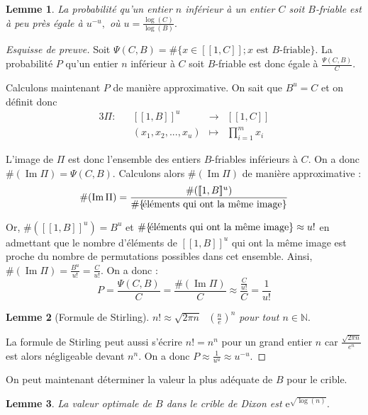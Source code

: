 \documentclass[french, 12pt, titlepage]{article}
\DeclareMathOperator{\Ima}{Im}
\newcommand{\N}{\mathbb{N}}
\newtheorem{lemme}{Lemme}
\begin{document}
\begin{lemme}
La probabilité qu'un entier $n$ inférieur à un entier $C$ soit
$B$-friable est à peu près égale à $u^{-u},$ où $u = \frac{\log(C)}{\log(B)}.$
\end{lemme}

\begin{proof}[Esquisse de preuve]

Soit $\Psi(C, B) = \#\{x \in [\![1, C]\!]; x \text{ est } B\text{-friable}\}.$
La probabilité $P$ qu'un entier $n$ inférieur à $C$ soit $B$-friable est donc égale à $\frac{\Psi(C, B)}{C}.$

Calculons maintenant $P$ de manière approximative. On sait que $B^u =
C$ et on définit donc 
\begin{alignat*}{3}
\Pi : && [\![1, B]\!]^u & \to & [\![1, C]\!] \\
&& (x_1, x_2, ..., x_u) & \mapsto & \prod\limits_{i = 1}^m x_i
\end{alignat*}

L'image de $\Pi$ est donc l'ensemble des entiers $B$-friables inférieurs à $C.$ On a donc $\#(\Ima \Pi) = \Psi(C, B).$ Calculons alors $\#(\Ima \Pi)$ de manière approximative :
\[\#(\Ima \Pi) = \frac{\#([\![1, B]\!]^u)}{\#\{\text{\!éléments qui ont la même image}\}}\]

Or, $\#([\![1, B]\!]^u) = B^u$ et
$\#\{\text{\!éléments qui ont la même image}\} \approx u!$ en admettant que le nombre d'éléments de $[\![1, B]\!]^u$ qui ont la même image est proche du nombre de permutations possibles dans cet ensemble.
Ainsi, $\#(\Ima \Pi) = \frac{B^u}{u!} = \frac{C}{u!}.$ On a donc :
\[P = \frac{\Psi(C, B)}{C} = \frac{\#(\Ima \Pi)}{C} \approx \frac{\frac{C}{u!}}{C} = \frac{1}{u!}\]

\begin{lemme}[Formule de Stirling]
$n! \approx \sqrt{2\pi n}\text{ }(\frac{n}{e})^n$ pour tout $n \in \N.$
\end{lemme}

La formule de Stirling peut aussi s'écrire $n! = n^n$ pour un grand entier $n$ car $\frac{\sqrt{2\pi n}}{e^n}$ est alors négligeable devant $n^n.$
On a donc $P \approx \frac{1}{u^u} \approx u^{-u}.$ 
\end{proof}

On peut maintenant déterminer la valeur la plus adéquate de $B$ pour le crible.

\begin{lemme}
La valeur optimale de $B$ dans le crible de Dixon est $\text{e}^{\sqrt{\log(n)}}.$
\end{lemme}
\end{document}
